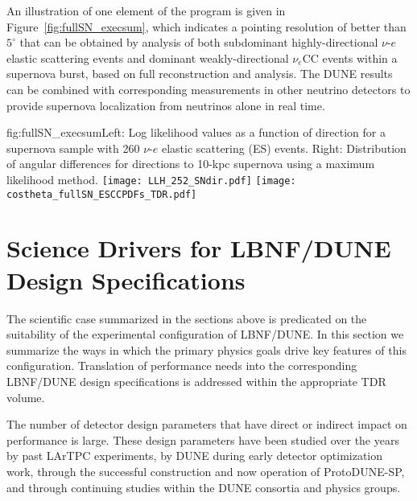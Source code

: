 An illustration 
of one element of the program is given in Figure~\ref{fig:fullSN_execsum}, 
which indicates a pointing resolution of better than $5^\circ$ that 
can be obtained by analysis of both subdominant highly-directional $\nu$-$e$ elastic scattering 
events and dominant weakly-directional $\nu_e$CC events within a supernova burst, based 
on full reconstruction and analysis. The DUNE results can be 
combined with corresponding measurements in other neutrino detectors to 
provide supernova localization from neutrinos alone in real time.
%
\begin{dunefigure}{fig:fullSN_execsum}{Left: Log
    likelihood values as a function of direction for a
    supernova sample with 260 $\nu$-$e$ elastic scattering (ES) events.  Right: Distribution of angular differences for
    directions to 10-kpc supernova using a maximum likelihood
    method.}
  \texttt{[image: LLH\_252\_SNdir.pdf]}
  \texttt{[image: costheta\_fullSN\_ESCCPDFs\_TDR.pdf]}
\end{dunefigure}

\section{Science Drivers for LBNF/DUNE Design Specifications}
\label{sec:exec-phys-key-reqs}

The scientific case summarized in the sections above
is predicated on the suitability of the experimental
configuration of LBNF/DUNE.  In this section we summarize
the ways in which the primary physics goals drive key features
of this configuration.  
Translation of performance needs into the
corresponding LBNF/DUNE design specifications is addressed within
the appropriate TDR volume.


The number of detector design parameters that have direct
or indirect impact on performance is large.  These design
parameters have been studied over the years by past LArTPC
experiments, by DUNE during early detector optimization work,
through the successful construction and now operation of
ProtoDUNE-SP, and through continuing studies within the
DUNE consortia and physics groups.

